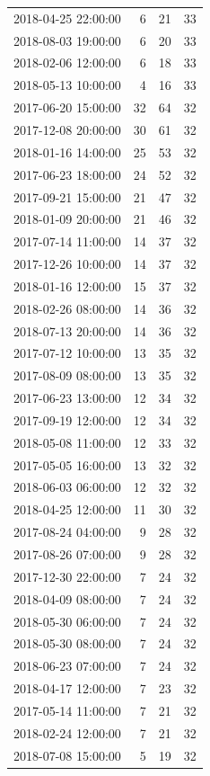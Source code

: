 \begin{tabular}{lrrr}
2018-04-25 22:00:00 & 6 & 21 & 33 \\
2018-08-03 19:00:00 & 6 & 20 & 33 \\
2018-02-06 12:00:00 & 6 & 18 & 33 \\
2018-05-13 10:00:00 & 4 & 16 & 33 \\
2017-06-20 15:00:00 & 32 & 64 & 32 \\
2017-12-08 20:00:00 & 30 & 61 & 32 \\
2018-01-16 14:00:00 & 25 & 53 & 32 \\
2017-06-23 18:00:00 & 24 & 52 & 32 \\
2017-09-21 15:00:00 & 21 & 47 & 32 \\
2018-01-09 20:00:00 & 21 & 46 & 32 \\
2017-07-14 11:00:00 & 14 & 37 & 32 \\
2017-12-26 10:00:00 & 14 & 37 & 32 \\
2018-01-16 12:00:00 & 15 & 37 & 32 \\
2018-02-26 08:00:00 & 14 & 36 & 32 \\
2018-07-13 20:00:00 & 14 & 36 & 32 \\
2017-07-12 10:00:00 & 13 & 35 & 32 \\
2017-08-09 08:00:00 & 13 & 35 & 32 \\
2017-06-23 13:00:00 & 12 & 34 & 32 \\
2017-09-19 12:00:00 & 12 & 34 & 32 \\
2018-05-08 11:00:00 & 12 & 33 & 32 \\
2017-05-05 16:00:00 & 13 & 32 & 32 \\
2018-06-03 06:00:00 & 12 & 32 & 32 \\
2018-04-25 12:00:00 & 11 & 30 & 32 \\
2017-08-24 04:00:00 & 9 & 28 & 32 \\
2017-08-26 07:00:00 & 9 & 28 & 32 \\
2017-12-30 22:00:00 & 7 & 24 & 32 \\
2018-04-09 08:00:00 & 7 & 24 & 32 \\
2018-05-30 06:00:00 & 7 & 24 & 32 \\
2018-05-30 08:00:00 & 7 & 24 & 32 \\
2018-06-23 07:00:00 & 7 & 24 & 32 \\
2018-04-17 12:00:00 & 7 & 23 & 32 \\
2017-05-14 11:00:00 & 7 & 21 & 32 \\
2018-02-24 12:00:00 & 7 & 21 & 32 \\
2018-07-08 15:00:00 & 5 & 19 & 32 \\

\end{tabular}
